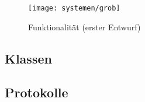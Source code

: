 \begin{figure}[h]
\texttt{[image: systemen/grob]}
\caption{Funktionalit\"at (erster Entwurf)}
\end{figure}



\subsection{Klassen}


\subsection{Protokolle}

